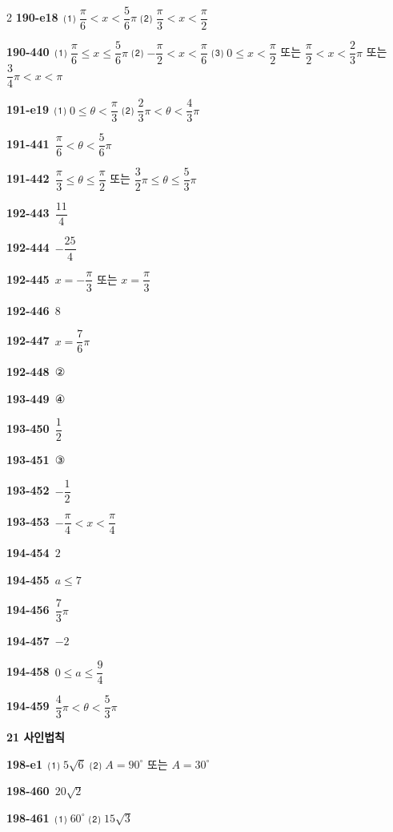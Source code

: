 \documentclass[10pt,a4paper]{article}
\begin{document}
\begin{multicols}{2}
\noindent\textbf{190-e18}\ ⑴ $\dfrac{\pi}{6}<x<\dfrac{5}{6}\pi$ ⑵ $\dfrac{\pi}{3}<x<\dfrac{\pi}{2}$\par
\noindent\textbf{190-440}\ ⑴ $\dfrac{\pi}{6}\le x\le\dfrac{5}{6}\pi$ ⑵ $-\dfrac{\pi}{2}<x<\dfrac{\pi}{6}$ ⑶ $0\le x<\dfrac{\pi}{2}$ 또는 $\dfrac{\pi}{2}<x<\dfrac{2}{3}\pi$ 또는 $\dfrac{3}{4}\pi<x<\pi$\par
\noindent\textbf{191-e19}\ ⑴ $0\le\theta<\dfrac{\pi}{3}$ ⑵ $\dfrac{2}{3}\pi<\theta<\dfrac{4}{3}\pi$\par
\noindent\textbf{191-441}\ $\dfrac{\pi}{6}<\theta<\dfrac{5}{6}\pi$\par
\noindent\textbf{191-442}\ $\dfrac{\pi}{3}\le\theta\le\dfrac{\pi}{2}$ 또는 $\dfrac{3}{2}\pi\le\theta\le\dfrac{5}{3}\pi$\par
\noindent\textbf{192-443}\ $\dfrac{11}{4}$\par
\noindent\textbf{192-444}\ $-\dfrac{25}{4}$\par
\noindent\textbf{192-445}\ $x=-\dfrac{\pi}{3}$ 또는 $x=\dfrac{\pi}{3}$\par
\noindent\textbf{192-446}\ $8$\par
\noindent\textbf{192-447}\ $x=\dfrac{7}{6}\pi$\par
\noindent\textbf{192-448}\ ②\par
\noindent\textbf{193-449}\ ④\par
\noindent\textbf{193-450}\ $\dfrac{1}{2}$\par
\noindent\textbf{193-451}\ ③\par
\noindent\textbf{193-452}\ $-\dfrac{1}{2}$\par
\noindent\textbf{193-453}\ $-\dfrac{\pi}{4}<x<\dfrac{\pi}{4}$\par
\noindent\textbf{194-454}\ $2$\par
\noindent\textbf{194-455}\ $a\le 7$\par
\noindent\textbf{194-456}\ $\dfrac{7}{3}\pi$\par
\noindent\textbf{194-457}\ $-2$\par
\noindent\textbf{194-458}\ $0\le a\le\dfrac{9}{4}$\par
\noindent\textbf{194-459}\ $\dfrac{4}{3}\pi<\theta<\dfrac{5}{3}\pi$\par
\noindent\textbf{21 사인법칙}\par\smallskip
\noindent\textbf{198-e1}\ ⑴ $5\sqrt{6}$ ⑵ $A=90^\circ$ 또는 $A=30^\circ$\par
\noindent\textbf{198-460}\ $20\sqrt{2}$\par
\noindent\textbf{198-461}\ ⑴ $60^\circ$ ⑵ $15\sqrt{3}$\par

\end{multicols}
\end{document}
